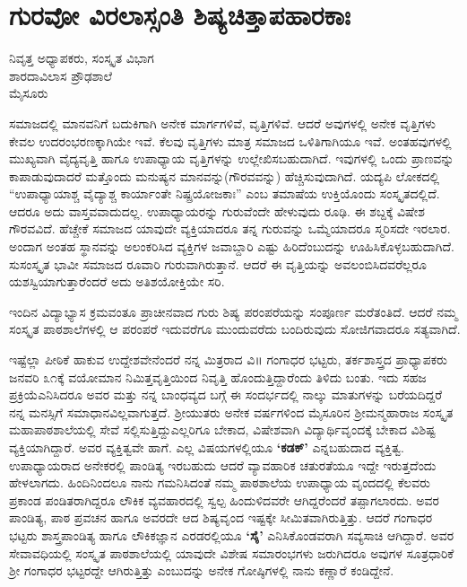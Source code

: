 {\fontsize{14}{16}\selectfont
\chapter{ಗುರವೋ ವಿರಲಾಸ್ಸಂತಿ ಶಿಷ್ಯ\enginline{-}ಚಿತ್ತಾಪಹಾರಕಾಃ}

\begin{center}
\smallskip

ನಿವೃತ್ತ ಅಧ್ಯಾಪಕರು, ಸಂಸ್ಕೃತ ವಿಭಾಗ\\
ಶಾರದಾವಿಲಾಸ ಪ್ರೌಢಶಾಲೆ \\ 
ಮೈಸೂರು
\addrule
\end{center}

ಸಮಾಜದಲ್ಲಿ ಮಾನವನಿಗೆ ಬದುಕಿಗಾಗಿ ಅನೇಕ ಮಾರ್ಗಗಳಿವೆ, ವೃತ್ತಿಗಳಿವೆ. ಆದರೆ ಅವುಗಳಲ್ಲಿ ಅನೇಕ ವೃತ್ತಿಗಳು ಕೇವಲ ಉದರಂಭರಣಕ್ಕಾಗಿಯೇ ಇವೆ. ಕೆಲವು ವೃತ್ತಿಗಳು ಮಾತ್ರ ಸಮಾಜದ ಒಳಿತಿಗಾಗಿಯೂ ಇವೆ. ಅಂತಹವುಗಳಲ್ಲಿ ಮುಖ್ಯವಾಗಿ ವೈದ್ಯವೃತ್ತಿ ಹಾಗೂ ಉಪಾಧ್ಯಾಯ ವೃತ್ತಿಗಳನ್ನು ಉಲ್ಲೇಖಿಸಬಹುದಾಗಿದೆ. ಇವುಗಳಲ್ಲಿ ಒಂದು ಪ್ರಾಣವನ್ನು ಕಾಪಾಡುವುದಾದರೆ ಮತ್ತೊಂದು ಮನುಷ್ಯನ ಮಾನವನ್ನು(ಗೌರವವನ್ನು) ಹೆಚ್ಚಿಸುವುದಾಗಿದೆ. ಯದ್ಯಪಿ ಲೋಕದಲ್ಲಿ “ಉಪಾಧ್ಯಾಯಾಶ್ಚ ವೈದ್ಯಾಶ್ಚ ಕಾರ್ಯಾಂತೇ ನಿಷ್ಪ್ರಯೋಜಕಾಃ” ಎಂಬ ತಮಾಷೆಯ ಉಕ್ತಿಯೊಂದು ಸಂಸ್ಕೃತದಲ್ಲಿದೆ. ಆದರೂ ಅದು ವಾಸ್ತವವಾದುದಲ್ಲ. ಉಪಾಧ್ಯಾಯರನ್ನು ಗುರುವೆಂದೇ ಹೇಳುವುದು ರೂಢಿ. ಈ ಶಬ್ದಕ್ಕೆ ವಿಷೇಶ ಗೌರವವಿದೆ. ಹೆಚ್ಚೇಕೆ ಸಮಾಜದ ಯಾವುದೇ ವ್ಯಕ್ತಿಯಾದರೂ ತನ್ನ ಗುರುವನ್ನು ಒಮ್ಮೆಯಾದರೂ ಸ್ಮರಿಸದೇ ಇರಲಾರ. ಅಂದಾಗ ಅಂತಹ ಸ್ಥಾನವನ್ನು ಅಲಂಕರಿಸಿದ ವ್ಯಕ್ತಿಗಳ ಜವಾಬ್ದಾರಿ ಎಷ್ಟು ಹಿರಿದೆಂಬುದನ್ನು ಊಹಿಸಿಕೊಳ್ಳಬಹುದಾಗಿದೆ. ಸುಸಂಸ್ಕೃತ ಭಾವೀ ಸಮಾಜದ ರೂವಾರಿ ಗುರುವಾಗಿರುತ್ತಾನೆ. ಆದರೆ ಈ ವೃತ್ತಿಯನ್ನು ಅವಲಂಬಿಸಿದವರೆಲ್ಲರೂ ಯಶಸ್ವಿಯಾಗುತ್ತಾರೆಂದರೆ ಅದು ಅತಿಶಯೋಕ್ತಿಯೇ ಸರಿ.

ಇಂದಿನ ವಿದ್ಯಾಭ್ಯಾಸ ಕ್ರಮವಂತೂ ಪ್ರಾಚೀನವಾದ ಗುರು ಶಿಷ್ಯ ಪರಂಪರೆಯನ್ನು ಸಂಪೂರ್ಣ ಮರೆತಂತಿದೆ. ಆದರೆ ನಮ್ಮ ಸಂಸ್ಕೃತ ಪಾಠಶಾಲೆಗಳಲ್ಲಿ ಆ ಪರಂಪರೆ ಇದುವರೆಗೂ ಮುಂದುವರೆದು ಬಂದಿರುವುದು ಸೋಜಿಗವಾದರೂ ಸತ್ಯವಾಗಿದೆ.

ಇಷ್ಟೆಲ್ಲಾ ಪೀಠಿಕೆ ಹಾಕುವ ಉದ್ದೇಶವೇನೆಂದರೆ ನನ್ನ ಮಿತ್ರರಾದ ವಿ॥ \hbox{ಗಂಗಾಧರ} ಭಟ್ಟರು, ತರ್ಕಶಾಸ್ತ್ರದ ಪ್ರಾಧ್ಯಾಪಕರು ಜನವರಿ ೩೧ಕ್ಕೆ ವಯೋಮಾನ ನಿಮಿತ್ತ\break ವೃತ್ತಿಯಿಂದ ನಿವೃತ್ತಿ ಹೊಂದುತ್ತಿದ್ದಾರೆಂದು ತಿಳಿದು ಬಂತು. ಇದು ಸಹಜ ಪ್ರಕ್ರಿಯೆ\break  ಎನಿಸಿದರೂ ಅವರ ಮತ್ತು ನನ್ನ ಬಾಂಧವ್ಯದ ಬಗ್ಗೆ ಈ ಸಂದರ್ಭದಲ್ಲಿ ನಾಲ್ಕು ಮಾತುಗಳನ್ನು ಬರೆಯದಿದ್ದರೆ ನನ್ನ ಮನಸ್ಸಿಗೆ ಸಮಾಧಾನವಿಲ್ಲವಾಗುತ್ತದೆ. ಶ್ರೀಯುತರು ಅನೇಕ ವರ್ಷಗಳಿಂದ ಮೈಸೂರಿನ ಶ್ರೀಮನ್ಮಹಾರಾಜ ಸಂಸ್ಕೃತ ಮಹಾಪಾಠಶಾಲೆಯಲ್ಲಿ ಸೇವೆ ಸಲ್ಲಿಸುತ್ತಿದ್ದುಎಲ್ಲರಿಗೂ ಬೇಕಾದ, ವಿಷೇಶವಾಗಿ ವಿದ್ಯಾರ್ಥಿವೃಂದಕ್ಕೆ ಬೇಕಾದ ವಿಶಿಷ್ಟ ವ್ಯಕ್ತಿಯಾಗಿದ್ದಾರೆ. ಅವರ ವ್ಯಕ್ತಿತ್ವವೇ ಹಾಗೆ. ಎಲ್ಲ ವಿಷಯಗಳಲ್ಲಿಯೂ \textbf{‘ಕಡಕ್’} ಎನ್ನಬಹುದಾದ ವ್ಯಕ್ತಿತ್ವ. ಉಪಾಧ್ಯಾಯರಾದ ಅನೇಕರಲ್ಲಿ ಪಾಂಡಿತ್ಯ ಇರಬಹುದು ಆದರೆ ವ್ಯಾವಹಾರಿಕ ಚತುರತೆಯೂ ಇದ್ದೇ ಇರುತ್ತದೆಂದು ಹೇಳಲಾಗದು. ಹಿಂದಿನಿಂದಲೂ ನಾನು ಗಮನಿಸಿದಂತೆ ನಮ್ಮ ಪಾಠಶಾಲೆಯ ಉಪಾಧ್ಯಾಯ ವೃಂದದಲ್ಲಿ ಕೆಲವರು ಪ್ರಕಾಂಡ ಪಂಡಿತರಾಗಿದ್ದರೂ ಲೌಕಿಕ ವ್ಯವಹಾರದಲ್ಲಿ ಸ್ವಲ್ಪ ಹಿಂದುಳಿದವರೇ ಆಗಿದ್ದರೆಂದರೆ ತಪ್ಪಾಗಲಾರದು. ಅವರ ಪಾಂಡಿತ್ಯ, ಪಾಠ ಪ್ರವಚನ ಹಾಗೂ ಅವರದೇ ಆದ ಶಿಷ್ಯವೃಂದ ಇಷ್ಟಕ್ಕೇ ಸೀಮಿತವಾಗಿರುತ್ತಿತ್ತು. ಆದರೆ ಗಂಗಾಧರ ಭಟ್ಟರು ಶಾಸ್ತ್ರಪಾಂಡಿತ್ಯ ಹಾಗೂ ಲೌಕಿಕಜ್ಞಾನ ಎರಡರಲ್ಲಿಯೂ \textbf{‘ಸೈ’} ಎನಿಸಿಕೊಂಡವರಾಗಿ ಸವ್ಯಸಾಚಿ ಆಗಿದ್ದಾರೆ. ಅವರ ಸೇವಾವಧಿಯಲ್ಲಿ ಸಂಸ್ಕೃತ ಪಾಠಶಾಲೆಯಲ್ಲಿ ಯಾವುದೇ ವಿಶೇಷ ಸಮಾರಂಭಗಳು ಜರುಗಿದರೂ ಅವುಗಳ ಸೂತ್ರಧಾರಿಕೆ ಶ್ರೀ ಗಂಗಾಧರ ಭಟ್ಟರದ್ದೇ ಆಗಿರುತ್ತಿತ್ತು ಎಂಬುದನ್ನು ಅನೇಕ ಗೋಷ್ಠಿಗಳಲ್ಲಿ ನಾನು ಕಣ್ಣಾರೆ ಕಂಡಿದ್ದೇನೆ.

}
